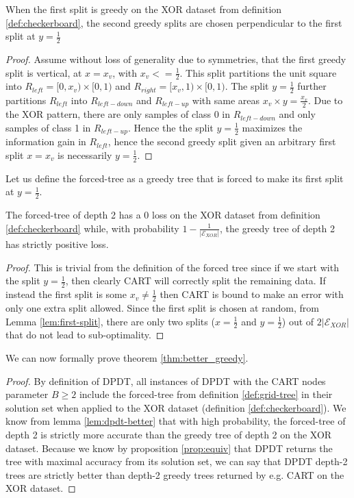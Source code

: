 \begin{lemma}\label{lem:second-split}
    When the first split is greedy on the XOR dataset from definition \ref{def:checkerboard}, the second greedy splits are chosen perpendicular to the first split at $y=\frac{1}{2}$
\end{lemma}

\begin{proof}
Assume without loss of generality due to symmetries, that the first greedy split is vertical, at \(x=x_v\), with $x_v <= \frac{1}{2}$. This split partitions the unit square into
$R_{left} = [0,x_v)\times[0,1)$ and $R_{right} = [x_v,1)\times[0,1)$. The split $y=\frac{1}{2}$ further partitions $R_{left}$ into $R_{left-down}$ and $R_{left-up}$ with same areas $x_v \times y = \frac{x_v}{2}$. Due to the XOR pattern, there are only samples of class 0 in $R_{left-down}$ and only samples of class 1 in $R_{left-up}$. Hence the the split $y = \frac{1}{2}$ maximizes the information gain in $R_{left}$, hence the second greedy split given an arbitrary first split $x=x_v$ is necessarily $y=\frac{1}{2}$.
\end{proof}
\begin{definition}\label{def:grid-tree}
Let us define the forced-tree as a greedy tree that is forced to make its first split at $y=\frac{1}{2}$.
\end{definition}

\begin{lemma}\label{lem:dpdt-better}
The forced-tree of depth 2 has a 0 loss on the XOR dataset from definition \ref{def:checkerboard} while, with probability $1-\frac{1}{|\mathcal{E}_{XOR}|}$, the greedy tree of depth 2 has strictly positive loss. 
\end{lemma}

\begin{proof}
This is trivial from the definition of the forced tree since if we start with the split $y=\frac{1}{2}$, then clearly CART will correctly split the remaining data. If instead the first split is some  $x_v \neq \frac{1}{2}$ then CART is bound to make an error with only one extra split allowed. Since the first split is chosen at random, from Lemma \ref{lem:first-split}, there are only two splits ($x=\frac{1}{2}$ and $y=\frac{1}{2}$) out of $2 |\mathcal{E}_{XOR}|$ that do not lead to sub-optimality.   
\end{proof}
We can now formally prove theorem \ref{thm:better_greedy}.
\begin{proof}
    By definition of DPDT, all instances of DPDT with the CART nodes parameter $B\geq2$ include the forced-tree from definition \ref{def:grid-tree} in their solution set when applied to the XOR dataset (definition \ref{def:checkerboard}). 
    We know from lemma \ref{lem:dpdt-better} that with high probability, the forced-tree of depth 2 is strictly more accurate than the greedy tree of depth 2 on the XOR dataset. Because we know by proposition \ref{prop:equiv} that DPDT returns the tree with maximal accuracy from its solution set, we can say that DPDT depth-2 trees are strictly better than depth-2 greedy trees returned by e.g. CART on the XOR dataset. 
\end{proof}

